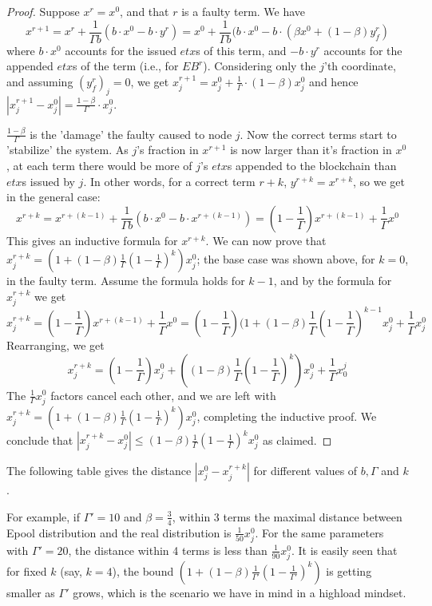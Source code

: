 \begin{proof} 
	Suppose $x^r=x^0$, and that $r$ is a faulty term. We have 
    $$x^{r+1}=x^r+\frac{1}{\Gamma b}(b\cdot x^0-b\cdot y^r)=x^0+\frac{1}{\Gamma b}(b\cdot x^0-b\cdot(\beta x^0+(1-\beta) y^r_f)$$
    where $b\cdot x^0$ accounts for the issued $etx$s of this term, and $-b\cdot y^r$ accounts for the appended $etx$s of the term (i.e., for $EB^r$). Considering only the $j$'th coordinate, and assuming $(y^r_f)_j=0$, we get $x^{r+1}_j=x^0_j+\frac{1}{\Gamma}\cdot(1-\beta)x^0_j$ and hence $|x^{r+1}_j-x^0_j|=\frac{1-\beta}{\Gamma}\cdot x^0_j$. 
    
    $\frac{1-\beta}{\Gamma}$ is the 'damage' the faulty caused to node $j$. Now the correct terms start to 'stabilize' the system. As $j$'s fraction in $x^{r+1}$ is now larger than it's fraction in $x^0$, at each term there would be more of $j$'s $etx$s appended to the blockchain than $etx$s issued by $j$. In other words, for a correct term $r+k$, $y^{r+k}=x^{r+k}$, so we get in the general case:
    $$x^{r+k}=x^{r+(k-1)}+\frac{1}{\Gamma b}(b\cdot x^0-b\cdot x^{r+(k-1)})=(1-\frac{1}{\Gamma})x^{r+(k-1)}+\frac{1}{\Gamma}x^0$$
    This gives an inductive formula for $x^{r+k}$. We can now prove that $x^{r+k}_j=\left(1+\left(1-\beta\right)\frac{1}{\Gamma}\left(1-\frac{1}{\Gamma}\right)^k\right)x^0_j$; the base case was shown above, for $k=0$, in the faulty term. Assume the formula holds for $k-1$, and by the formula for $x^{r+k}_j$ we get
    $$x^{r+k}_j=(1-\frac{1}{\Gamma})x^{r+(k-1)}+\frac{1}{\Gamma }x^0=(1-\frac{1}{\Gamma})(1+(1-\beta)\frac{1}{\Gamma}(1-\frac{1}{\Gamma})^{k-1}x^0_j+\frac{1}{\Gamma}x^0_j$$
    Rearranging, we get
    $$x^{r+k}_j=(1-\frac{1}{\Gamma})x^0_j+((1-\beta)\frac{1}{\Gamma}(1-\frac{1}{\Gamma})^k)x^0_j+\frac{1}{\Gamma}x^j_0$$
    The $\frac{1}{\Gamma}x^0_j$ factors cancel each other, and we are left with $x^{r+k}_j=\left(1+\left(1-\beta\right)\frac{1}{\Gamma}\left(1-\frac{1}{\Gamma}\right)^k\right)x^0_j$, completing the inductive proof. We conclude that $|x^{r+k}_j-x_j^0|\leq\left(1-\beta\right)\frac{1}{\Gamma}\left(1-\frac{1}{\Gamma}\right)^kx^0_j$ as claimed.
\end{proof}
The following table gives the distance $|x^0_j-x^{r+k}_j|$ for different values of $b,\Gamma$ and $k$.


For example, if $\Gamma'=10$ and $\beta=\frac{3}{4}$, within 3 terms the maximal distance between Epool distribution and the real distribution is $\frac{1}{50}x^0_j$. For the same parameters with $\Gamma'=20$, the distance within 4 terms is less than $\frac{1}{90}x^0_j$. It is easily seen that for fixed $k$ (say, $k=4$), the bound $(1+(1-\beta)\frac{1}{\Gamma'}(1-\frac{1}{\Gamma'})^k)$ is getting smaller as $\Gamma'$ grows, which is the scenario we have in mind in a highload mindset.

